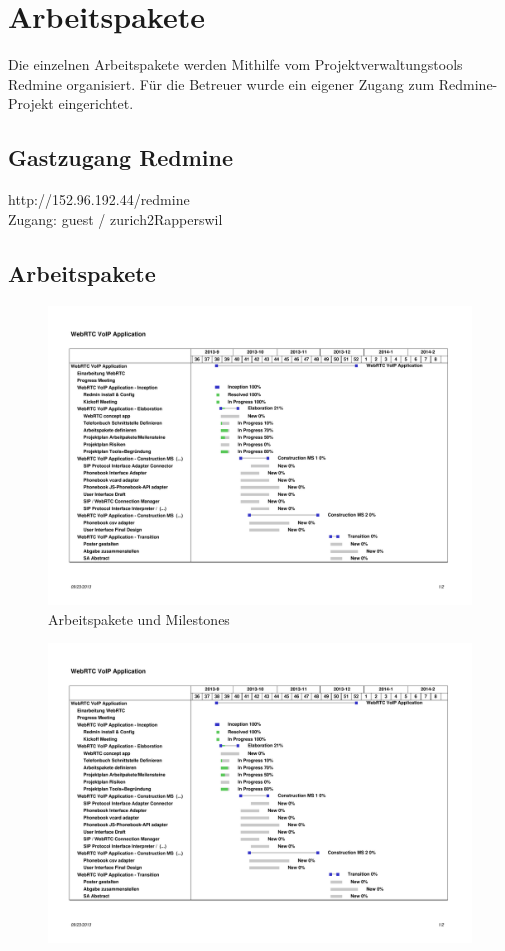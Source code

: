 \chapter{Arbeitspakete}
Die einzelnen Arbeitspakete werden Mithilfe vom Projektverwaltungstools Redmine organisiert. Für die Betreuer wurde ein eigener Zugang zum Redmine-Projekt eingerichtet.

\section{Gastzugang Redmine}
http://152.96.192.44/redmine \\
Zugang: guest / zurich2Rapperswil \\

\begin{landscape}
\section{Arbeitspakete}
	\begin{figure}[H]
		\centering
			\includegraphics[trim=1.5cm 2.5cm 1cm 3cm, clip=true,page=1,width=1.4\textwidth]{media/jsvoipcommunication-gantt.pdf}
			\caption[ArbeitpaketeUndMeilstones]{Arbeitspakete und Milestones}
			\label{flowDiagramm1}
	\end{figure}
	\begin{figure}[H]
		\centering
			\includegraphics[trim=1.5cm 10cm 1cm 0cm, clip=true,page=2,width=1.4\textwidth]{media/jsvoipcommunication-gantt.pdf}

\end{figure}
\end{landscape}
